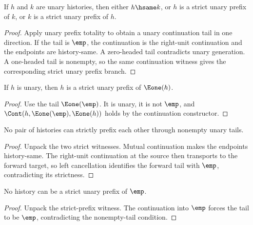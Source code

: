 \begin{theorem}
\label{thm:nat-unary-prefix-trichotomy-hsame-strict}
If $h$ and $k$ are unary histories, then either $h\hsame k$, or $h$ is a
strict unary prefix of $k$, or $k$ is a strict unary prefix of $h$.
\end{theorem}
\begin{proof}
Apply unary prefix totality to obtain a unary continuation tail in one
direction. If the tail is $\emp$, the continuation is the right-unit
continuation and the endpoints are history-same. A zero-headed tail contradicts
unary generation. A one-headed tail is nonempty, so the same continuation
witness gives the corresponding strict unary prefix branch.
\end{proof}

\begin{lemma}
\label{lem:nat-unary-strict-prefix-one-step}
If \(h\) is unary, then \(h\) is a strict unary prefix of \(\Eone(h)\).
\end{lemma}
\begin{proof}
Use the tail \(\Eone(\emp)\). It is unary, it is not \(\emp\), and
\(\Cont(h,\Eone(\emp),\Eone(h))\) holds by the continuation constructor.
\end{proof}

\begin{theorem}
\label{thm:nat-unary-strict-prefix-asymm}
No pair of histories can strictly prefix each other through nonempty unary
tails.
\end{theorem}
\begin{proof}
Unpack the two strict witnesses. Mutual continuation makes the endpoints
history-same. The right-unit continuation at the source then transports to the
forward target, so left cancellation identifies the forward tail with $\emp$,
contradicting its strictness.
\end{proof}

\begin{theorem}
\label{thm:nat-unary-strict-prefix-empty-right-absurd}
No history can be a strict unary prefix of \(\emp\).
\end{theorem}
\begin{proof}
Unpack the strict-prefix witness. The continuation into \(\emp\) forces the
tail to be \(\emp\), contradicting the nonempty-tail condition.
\end{proof}

